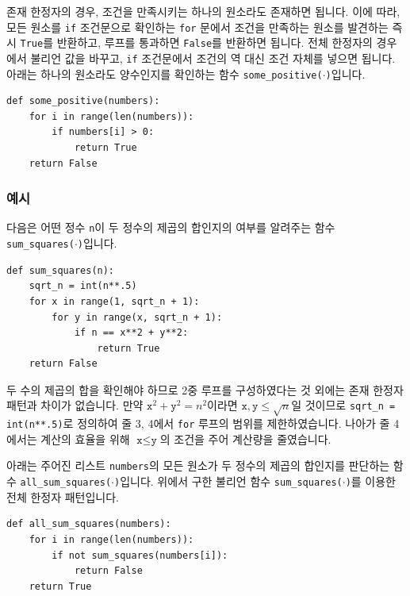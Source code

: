 \documentclass[../main.tex]{subfiles}
\begin{document}
존재 한정자의 경우, 조건을 만족시키는 하나의 원소라도 존재하면 됩니다.
이에 따라, 모든 원소를 \texttt{if} 조건문으로 확인하는 \texttt{for} 문에서 조건을 만족하는 원소를 발견하는 즉시 \texttt{True}를 반환하고, 루프를 통과하면 \texttt{False}를 반환하면 됩니다.
전체 한정자의 경우에서 불리언 값을 바꾸고, \texttt{if} 조건문에서 조건의 역 대신 조건 자체를 넣으면 됩니다.
아래는 하나의 원소라도 양수인지를 확인하는 함수 \texttt{some\_positive($\cdot$)}입니다.
\begin{verbatim}
def some_positive(numbers):
    for i in range(len(numbers)):
        if numbers[i] > 0:
            return True
    return False
\end{verbatim}

\subsubsection{예시}
다음은 어떤 정수 \texttt{n}이 두 정수의 제곱의 합인지의 여부를 알려주는 함수 \texttt{sum\_squares($\cdot$)}입니다.
\begin{verbatim}
def sum_squares(n):
    sqrt_n = int(n**.5)
    for x in range(1, sqrt_n + 1):
        for y in range(x, sqrt_n + 1):
            if n == x**2 + y**2:
                return True
    return False
\end{verbatim}
두 수의 제곱의 합을 확인해야 하므로 2중 루프를 구성하였다는 것 외에는 존재 한정자 패턴과 차이가 없습니다.
만약 $\texttt{x}^2 + \texttt{y}^2 = n^2$이라면 $\texttt{x}, \texttt{y} \leq \sqrt n$일 것이므로 \texttt{sqrt\_n = int(n**.5)}로 정의하여 줄 3, 4에서 \texttt{for} 루프의 범위를 제한하였습니다.
나아가 줄 4에서는 계산의 효율을 위해 $\texttt{x} \leq \texttt{y}$의 조건을 주어 계산량을 줄였습니다.

아래는 주어진 리스트 \texttt{numbers}의 모든 원소가 두 정수의 제곱의 합인지를 판단하는 함수 \texttt{all\_sum\_squares($\cdot$)}입니다.
위에서 구한 불리언 함수 \texttt{sum\_squares($\cdot$)}를 이용한 전체 한정자 패턴입니다.
\begin{verbatim}
def all_sum_squares(numbers):
    for i in range(len(numbers)):
        if not sum_squares(numbers[i]):
            return False
    return True
\end{verbatim}
\end{document}
